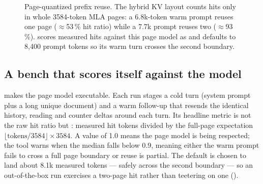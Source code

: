 \begin{figure}[htbp]
\centering
{}
\caption{Page-quantized prefix reuse. The hybrid KV layout counts hits only in
whole 3584-token MLA pages: a 6.8k-token warm prompt reuses one page
($\approx$53\,\% hit ratio) while a 7.7k prompt reuses two ($\approx$93\,\%).
 scores measured hits against this page
model as  and defaults to 8{,}400 prompt tokens so its
warm turn crosses the second boundary.}
\label{fig:proof-pagehits}
\end{figure}

\subsection{A bench that scores itself against the model}

 makes the page model executable. Each
run stages a cold turn (system prompt plus a long unique document) and a warm
follow-up that resends the identical history, reading
 and  counter deltas around each
turn. Its headline metric is not the raw hit ratio but
: measured hit tokens divided by the full-page
expectation $\lfloor \text{tokens}/3584 \rfloor \times 3584$. A value of 1.0
means the page model is being respected; the tool warns when the median falls
below 0.9, meaning either the warm prompt fails to cross a full page boundary
or reuse is partial. The default  is chosen to land
about 8.1k measured tokens --- safely across the second boundary --- so an
out-of-the-box run exercises a two-page hit rather than teetering on one
().

